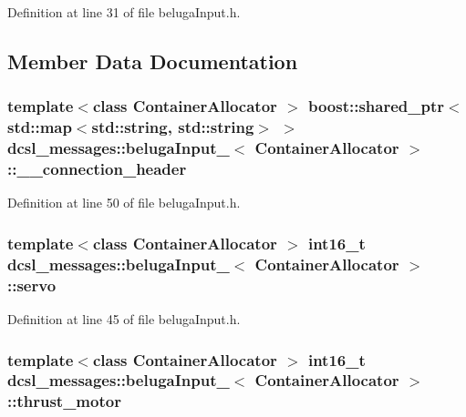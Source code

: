 \-Definition at line 31 of file beluga\-Input.\-h.



\subsection{\-Member \-Data \-Documentation}
\subsubsection[{\-\_\-\-\_\-connection\-\_\-header}]{\setlength{\rightskip}{0pt plus 5cm}template$<$class Container\-Allocator $>$ boost\-::shared\-\_\-ptr$<$std\-::map$<$std\-::string, std\-::string$>$ $>$ {\bf dcsl\-\_\-messages\-::beluga\-Input\-\_\-}$<$ \-Container\-Allocator $>$\-::{\bf \-\_\-\-\_\-connection\-\_\-header}}\label{structdcsl__messages_1_1belugaInput___af33eefcf90233803863452dc54f9efb7}


\-Definition at line 50 of file beluga\-Input.\-h.

\subsubsection[{servo}]{\setlength{\rightskip}{0pt plus 5cm}template$<$class Container\-Allocator $>$ int16\-\_\-t {\bf dcsl\-\_\-messages\-::beluga\-Input\-\_\-}$<$ \-Container\-Allocator $>$\-::{\bf servo}}\label{structdcsl__messages_1_1belugaInput___abeef251c0c652af7d4d3f45a4a2564ea}


\-Definition at line 45 of file beluga\-Input.\-h.

\subsubsection[{thrust\-\_\-motor}]{\setlength{\rightskip}{0pt plus 5cm}template$<$class Container\-Allocator $>$ int16\-\_\-t {\bf dcsl\-\_\-messages\-::beluga\-Input\-\_\-}$<$ \-Container\-Allocator $>$\-::{\bf thrust\-\_\-motor}}\label{structdcsl__messages_1_1belugaInput___a4ba01d6354c43f05b18796a37e2f1100}


